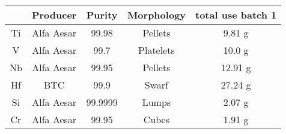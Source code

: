 \begin{tabular}{ccccc}
\toprule
{} &    Producer &   Purity & Morphology & total use batch 1 \\
\midrule
Ti &  Alfa Aesar &    99.98 &    Pellets &            9.81  g \\
V  &  Alfa Aesar &     99.7 &  Platelets &            10.0 g \\
Nb &  Alfa Aesar &    99.95 &    Pellets &           12.91 g \\
Hf &         BTC &     99.9 &      Swarf &           27.24 g \\
Si &  Alfa Aesar &  99.9999 &      Lumps &            2.07 g \\
Cr &  Alfa Aesar &    99.95 &      Cubes &            1.91 g \\
\bottomrule
\end{tabular}
